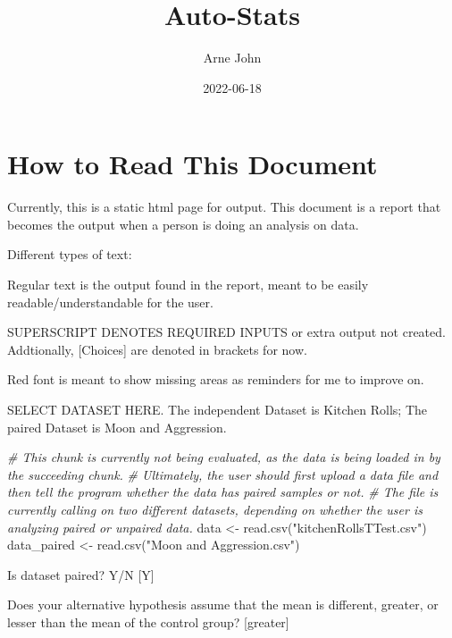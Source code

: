 \documentclass[
]{article}
\title{Auto-Stats}
\author{Arne John}
\date{2022-06-18}
\newenvironment{Shaded}{\begin{snugshade}}{\end{snugshade}}
\newcommand{\CommentTok}[1]{\textcolor[rgb]{0.56,0.35,0.01}{\textit{#1}}}
\newcommand{\FunctionTok}[1]{\textcolor[rgb]{0.00,0.00,0.00}{#1}}
\newcommand{\NormalTok}[1]{#1}
\newcommand{\OtherTok}[1]{\textcolor[rgb]{0.56,0.35,0.01}{#1}}
\newcommand{\StringTok}[1]{\textcolor[rgb]{0.31,0.60,0.02}{#1}}
\begin{document}
\maketitle

\hypertarget{how-to-read-this-document}{%
\section{How to Read This Document}\label{how-to-read-this-document}}

Currently, this is a static html page for output. This document is a
report that becomes the output when a person is doing an analysis on
data.

Different types of text:

Regular text is the output found in the report, meant to be easily
readable/understandable for the user.

SUPERSCRIPT DENOTES REQUIRED INPUTS or extra output not created.
Addtionally, {[}Choices{]} are denoted in brackets for now.

{Red font is meant to show missing areas as reminders for me to improve
on.}

SELECT DATASET HERE. The independent Dataset is Kitchen Rolls; The
paired Dataset is Moon and Aggression.

\begin{Shaded}
\begin{Highlighting}[]
\CommentTok{\# This chunk is currently not being evaluated, as the data is being loaded in by the succeeding chunk. }
\CommentTok{\# Ultimately, the user should first upload a data file and then tell the program whether the data has paired samples or not. }
\CommentTok{\# The file is currently calling on two different datasets, depending on whether the user is analyzing paired or unpaired data.}
\NormalTok{data }\OtherTok{\textless{}{-}} \FunctionTok{read.csv}\NormalTok{(}\StringTok{"kitchenRollsTTest.csv"}\NormalTok{)}
\NormalTok{data\_paired }\OtherTok{\textless{}{-}} \FunctionTok{read.csv}\NormalTok{(}\StringTok{"Moon and Aggression.csv"}\NormalTok{)}
\end{Highlighting}
\end{Shaded}

Is dataset paired? Y/N {[}Y{]}

Does your alternative hypothesis assume that the mean is different,
greater, or lesser than the mean of the control group? {[}greater{]}
\end{document}
